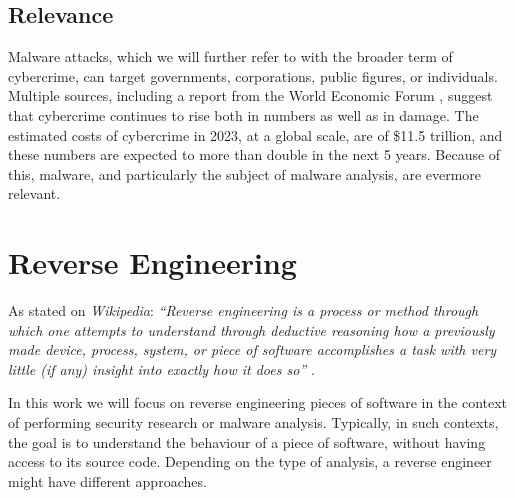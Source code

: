 \subsection{Relevance}

Malware attacks, which we will further refer to with the broader term of cybercrime, can target governments, corporations, public figures, or individuals. Multiple sources, including a report from the World Economic Forum \cite{wef_cybercrime}, suggest that cybercrime continues to rise both in numbers as well as in damage. The estimated costs of cybercrime in 2023, at a global scale, are of \$11.5 trillion, and these numbers are expected to more than double in the next 5 years. Because of this, malware, and particularly the subject of malware analysis, are evermore relevant.

\section{Reverse Engineering} %


As stated on \emph{Wikipedia}: \emph{``Reverse engineering is a process or method through which one attempts to understand through deductive reasoning how a previously made device, process, system, or piece of software accomplishes a task with very little (if any) insight into exactly how it does so''} \cite{re_wiki}.


In this work we will focus on reverse engineering pieces of software in the context of performing security research or malware analysis. Typically, in such contexts, the goal is to understand the behaviour of a piece of software, without having access to its source code. Depending on the type of analysis, a reverse engineer might have different approaches. 

